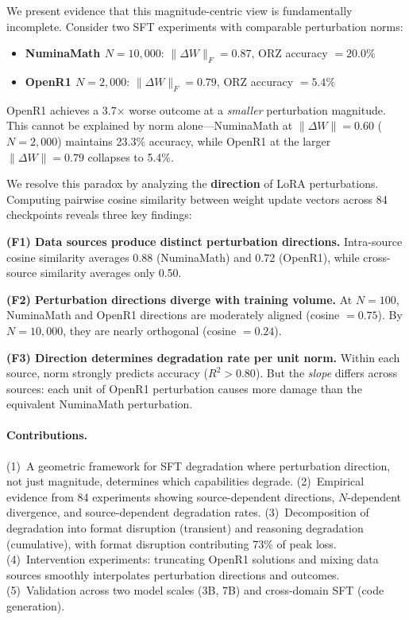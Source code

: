 \documentclass{article}
\begin{document}
We present evidence that this magnitude-centric view is fundamentally incomplete. Consider two SFT experiments with comparable perturbation norms:
\begin{itemize}
    \item \textbf{NuminaMath $N{=}10{,}000$}: $\|\Delta W\|_F = 0.87$, ORZ accuracy $= 20.0\%$
    \item \textbf{OpenR1 $N{=}2{,}000$}: $\|\Delta W\|_F = 0.79$, ORZ accuracy $= 5.4\%$
\end{itemize}
OpenR1 achieves a 3.7$\times$ worse outcome at a \emph{smaller} perturbation magnitude. This cannot be explained by norm alone---NuminaMath at $\|\Delta W\| = 0.60$ ($N{=}2{,}000$) maintains 23.3\% accuracy, while OpenR1 at the larger $\|\Delta W\| = 0.79$ collapses to 5.4\%.

We resolve this paradox by analyzing the \textbf{direction} of LoRA perturbations. Computing pairwise cosine similarity between weight update vectors across 84 checkpoints reveals three key findings:

\textbf{(F1) Data sources produce distinct perturbation directions.} Intra-source cosine similarity averages 0.88 (NuminaMath) and 0.72 (OpenR1), while cross-source similarity averages only 0.50.

\textbf{(F2) Perturbation directions diverge with training volume.} At $N{=}100$, NuminaMath and OpenR1 directions are moderately aligned (cosine $= 0.75$). By $N{=}10{,}000$, they are nearly orthogonal (cosine $= 0.24$).

\textbf{(F3) Direction determines degradation rate per unit norm.} Within each source, norm strongly predicts accuracy ($R^2 > 0.80$). But the \emph{slope} differs across sources: each unit of OpenR1 perturbation causes more damage than the equivalent NuminaMath perturbation.

\paragraph{Contributions.}
(1)~A geometric framework for SFT degradation where perturbation direction, not just magnitude, determines which capabilities degrade.
(2)~Empirical evidence from 84 experiments showing source-dependent directions, $N$-dependent divergence, and source-dependent degradation rates.
(3)~Decomposition of degradation into format disruption (transient) and reasoning degradation (cumulative), with format disruption contributing 73\% of peak loss.
(4)~Intervention experiments: truncating OpenR1 solutions and mixing data sources smoothly interpolates perturbation directions and outcomes.
(5)~Validation across two model scales (3B, 7B) and cross-domain SFT (code generation).
\end{document}
